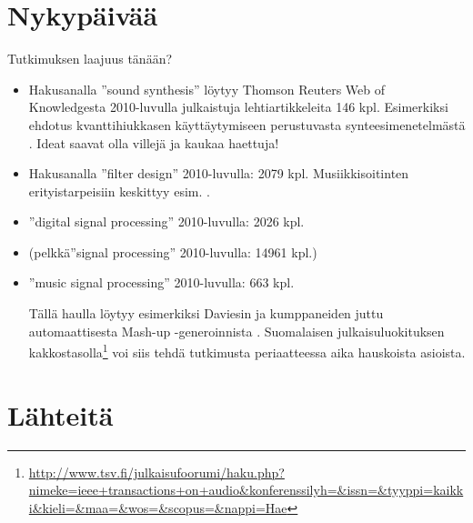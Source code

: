 \documentclass[pdf,9pt,handout]{beamer}
\begin{document}
\section{Nykypäivää}

\begin{frame}{Tutkimuksen laajuus tänään?}
  \begin{itemize}
  \item
    Hakusanalla ''sound synthesis'' löytyy Thomson Reuters Web of
    Knowledgesta 2010-luvulla julkaistuja lehtiartikkeleita 146
    kpl. Esimerkiksi ehdotus kvanttihiukkasen käyttäytymiseen
    perustuvasta synteesimenetelmästä
    \cite{CadizRamos2014quantum}. Ideat saavat olla villejä ja kaukaa
    haettuja!
  \item
    Hakusanalla ''filter design'' 2010-luvulla: 2079
    kpl. Musiikkisoitinten erityistarpeisiin keskittyy
    esim. \cite{Wishnick14timevaryingfilters}.
  \item
    ''digital signal processing'' 2010-luvulla: 2026 kpl.
  \item
    (pelkkä''signal processing'' 2010-luvulla: 14961 kpl.)
  \item
    ''music signal processing'' 2010-luvulla: 663 kpl.
    
    Tällä haulla löytyy esimerkiksi Daviesin ja kumppaneiden juttu
    automaattisesta Mash-up -generoinnista
    \cite{daviesEtal2014automashupper}. Suomalaisen
    julkaisuluokituksen
    kakkostasolla\footnote{{\tiny \url{http://www.tsv.fi/julkaisufoorumi/haku.php?nimeke=ieee+transactions+on+audio&konferenssilyh=&issn=&tyyppi=kaikki&kieli=&maa=&wos=&scopus=&nappi=Hae}}}
    voi siis tehdä tutkimusta periaatteessa aika hauskoista asioista.

  \end{itemize}
\end{frame}


\section{Lähteitä}
\end{document}
